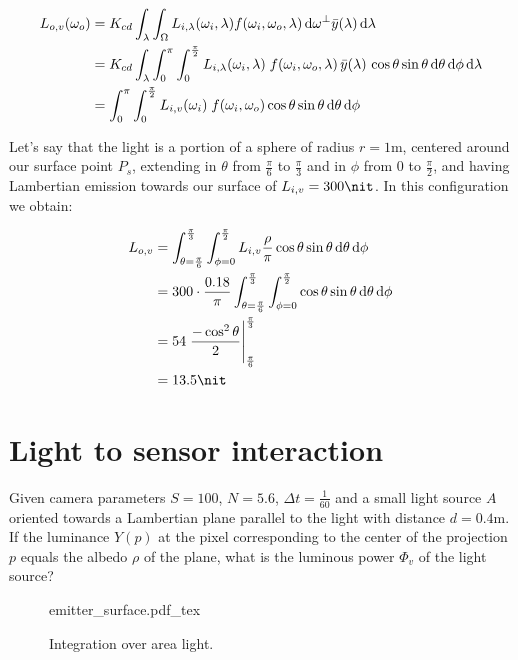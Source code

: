 \begin{displaymath}
\begin{split}
    L_{o,v}(\omega_o) &= K_{cd} \int_\lambda \int_\Omega L_{i,\lambda}(\omega_i, \lambda) f(\omega_i, \omega_o, \lambda) \d \omega^{\bot} \bar y(\lambda) \d\lambda \\
    &= K_{cd} \int_\lambda \int_0^\pi \int_0^{\frac \pi 2}  L_{i,\lambda}(\omega_i, \lambda)\;f(\omega_i, \omega_o, \lambda)\, \bar y(\lambda)\, \cos\theta \sin\theta \d\theta \d\phi \d\lambda \\
    &= \int_0^\pi \int_0^{\frac \pi 2}  L_{i,v}(\omega_i)\;f(\omega_i, \omega_o)\cos\theta \sin\theta \d\theta \d\phi
\end{split}
\end{displaymath}

Let's say that the light is a portion of a sphere of radius $r = \num{1}\unit{\meter}$, centered
around our surface point $P_s$, extending in $\theta$ from $\frac\pi6$ to $\frac\pi3$ and in
$\phi$ from $0$ to $\frac\pi2$, and having Lambertian emission towards our
surface of $L_{i,v} = \num{300}\unit{\nit}$.
In this configuration we obtain:

\begin{align*}
L_{o,v} &= \int_{\theta = \frac\pi 6}^\frac\pi 3 \int _{\phi = 0}^\frac\pi
2 L_{i,v} \frac\rho\pi \cos\theta \sin\theta \d\theta \d\phi \\
             &= 300\cdot \frac{0.18}\pi \int_{\theta = \frac\pi 6}^\frac\pi 3 \int _{\phi = 0}^\frac\pi 2 \cos\theta \sin\theta \d\theta \d\phi \\
             &= 54 \left.\frac{-\cos^2\theta}{2}\right|_{\frac\pi 6}^\frac\pi 3 \\
             &= \num{13.5}\unit{\nit}
\end{align*}

\section{Light to sensor interaction}

Given camera parameters $S=100$, $N=5.6$, $\Delta t = \frac 1 {60}$
and a small light source $A$ oriented towards a
Lambertian plane parallel to the light with distance
$d = \num{0.4}\unit{\meter}$. If the luminance $Y(p)$ at the pixel corresponding
to the center of the projection $p$ equals the albedo $\rho$ of the plane,
what is the luminous power $\Phi_v$ of the light source?
\begin{figure}[t]
    \centering
    \def\svgwidth{0.9\linewidth}
    {emitter_surface.pdf_tex}
    \caption{Integration over area light.}
\end{figure}

